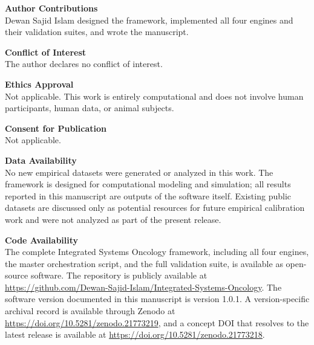 \documentclass[12pt,a4paper]{article}
\begin{document}
\textbf{Author Contributions} \\
Dewan Sajid Islam designed the framework, implemented all four engines and their validation suites, and wrote the manuscript.

\textbf{Conflict of Interest} \\
The author declares no conflict of interest.

\textbf{Ethics Approval} \\
Not applicable. This work is entirely computational and does not involve human participants, human data, or animal subjects.

\textbf{Consent for Publication} \\
Not applicable.

\textbf{Data Availability} \\
No new empirical datasets were generated or analyzed in this work. The framework is designed for computational modeling and simulation; all results reported in this manuscript are outputs of the software itself. Existing public datasets are discussed only as potential resources for future empirical calibration work and were not analyzed as part of the present release.

\textbf{Code Availability} \\
The complete Integrated Systems Oncology framework, including all four engines, the master orchestration script, and the full validation suite, is available as open-source software. The repository is publicly available at \href{https://github.com/Dewan-Sajid-Islam/Integrated-Systems-Oncology}{https://github.com/Dewan-Sajid-Islam/Integrated-Systems-Oncology}. The software version documented in this manuscript is version 1.0.1. A version-specific archival record is available through Zenodo at \href{https://doi.org/10.5281/zenodo.21773219}{https://doi.org/10.5281/zenodo.21773219}, and a concept DOI that resolves to the latest release is available at \href{https://doi.org/10.5281/zenodo.21773218}{https://doi.org/10.5281/zenodo.21773218}.
\end{document}
